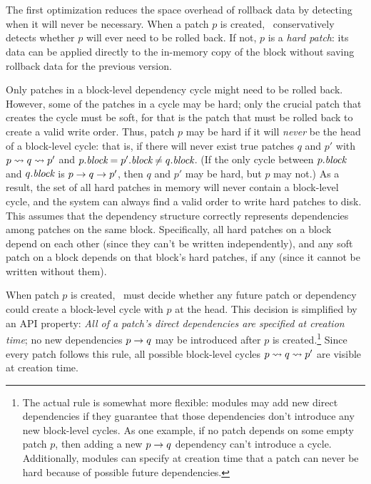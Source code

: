 \subsection{\Nrb\ \ChDescs}
\label{sec:patch:nrb}

The first optimization reduces the space overhead of rollback data by
detecting when it will never be necessary.
%
When a patch $p$ is created, \Kudos\ conservatively detects whether $p$
will ever need to be rolled back.
%
If not, $p$ is a \emph{hard patch}: its data can be applied
directly to the in-memory copy of the block without saving rollback data
for the previous version.


Only patches in a block-level dependency cycle might need to be rolled
back.
%
However, some of the patches in a cycle may be hard; only the crucial
patch that creates the cycle must be soft, for that is the patch that
must be rolled back to create a valid write order.
%
Thus, patch $p$ may be hard if it will \emph{never} be the head of a
block-level cycle: that is, if there will never exist true patches $q$
and $p'$ with $p \leadsto q \leadsto p'$ and $p.\textit{block} = p'.\textit{block}
\neq q.\textit{block}$.
%
(If the only cycle between $p.\textit{block}$ and $q.\textit{block}$ is $p
\rightarrow q \rightarrow p'$, then $q$ and $p'$ may be hard, but $p$ may
not.)
%
As a result, the set of all hard patches in memory will never contain
a block-level cycle, and the system can always find a valid order to
write hard patches to disk.
%
This assumes that the dependency structure correctly represents
dependencies among patches on the same block.
%
Specifically, all hard patches on a block depend on each other (since
they can't be written independently), and any soft patch on a block
depends on that block's hard patches, if any (since it cannot be written
without them).


When patch $p$ is created, \Kudos\ must decide whether any future
patch or dependency could create a block-level cycle with $p$ at the
head.
%
This decision is simplified by an API property: \emph{All of a patch's
direct dependencies are specified at creation time};
%
no new dependencies $p \rightarrow q$ may be introduced after $p$ is
created.\footnote{The actual rule is somewhat more flexible: modules may add
  new direct dependencies if they guarantee that those dependencies
  don't introduce any new block-level cycles.  As one example, if no
  patch depends on some empty patch $p$, then adding a new $p
  \rightarrow q$ dependency can't introduce a cycle.  Additionally,
  modules can specify at creation time that a patch can never be hard
  because of possible future dependencies.}
%
Since every patch follows this rule, all possible block-level cycles $p
\leadsto q \leadsto p'$ are visible at creation time.


